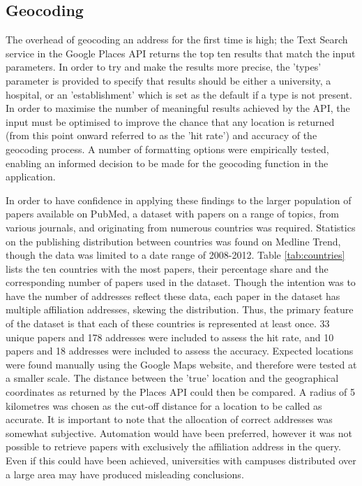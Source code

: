 \documentclass[Report.tex]{subfiles}
\begin{document}
\subsection{Geocoding}
The overhead of geocoding an address for the first time is high; the Text Search service in the Google Places API returns the top ten results that match the input parameters. In order to try and make the results more precise, the 'types' parameter is provided to specify that results should be either a university, a hospital, or an 'establishment' which is set as the default if a type is not present. In order to maximise the number of meaningful results achieved by the API, the input must be optimised to improve the chance that any location is returned (from this point onward referred to as the 'hit rate') and accuracy of the geocoding process. A number of formatting options were empirically tested, enabling an informed decision to be made for the geocoding function in the application.\newline

\noindent In order to have confidence in applying these findings to the larger population of papers available on PubMed, a dataset with papers on a range of topics, from various journals, and originating from numerous countries was required. Statistics on the publishing distribution between countries was found on Medline Trend\cite{medlinetrend}, though the data was limited to a date range of 2008-2012. Table \ref{tab:countries} lists the ten countries with the most papers, their percentage share and the corresponding number of papers used in the dataset. Though the intention was to have the number of addresses reflect these data, each paper in the dataset has multiple affiliation addresses, skewing the distribution. Thus, the primary feature of the dataset is that each of these countries is represented at least once. 33 unique papers and 178 addresses were included to assess the hit rate, and 10 papers and 18 addresses were included to assess the accuracy. Expected locations were found manually using the Google Maps website, and therefore were tested at a smaller scale. The distance between the 'true' location and the geographical coordinates as returned by the Places API could then be compared. A radius of 5 kilometres was chosen as the cut-off distance for a location to be called as accurate. It is important to note that the allocation of correct addresses was somewhat subjective. Automation would have been preferred, however it was not possible to retrieve papers with exclusively the affiliation address in the query. Even if this could have been achieved, universities with campuses distributed over a large area may have produced misleading conclusions.\newpage
\end{document}
